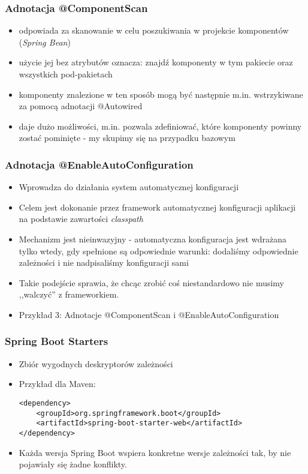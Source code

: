 \documentclass{beamer}
\begin{document}
\begin{frame}
\frametitle{Adnotacja @ComponentScan}
\begin{itemize}
\item odpowiada za skanowanie w celu poszukiwania w projekcie komponentów (\textit{Spring Bean})
\item użycie jej bez atrybutów oznacza: znajdź komponenty w tym pakiecie oraz wszystkich pod-pakietach
\item komponenty znalezione w ten sposób mogą być następnie m.in. wstrzykiwane za pomocą adnotacji @Autowired
\item daje dużo możliwości, m.in. pozwala zdefiniować, które komponenty powinny zostać pominięte - my skupimy się na przypadku bazowym
\end{itemize}
\end{frame}

\begin{frame}
\frametitle{Adnotacja @EnableAutoConfiguration}
\begin{itemize}
\item Wprowadza do działania system automatycznej konfiguracji
\item Celem jest dokonanie przez framework automatycznej konfiguracji aplikacji na podstawie zawartości \textit{classpath}
\item Mechanizm jest nieinwazyjny - automatyczna konfiguracja jest wdrażana tylko wtedy, gdy spełnione są odpowiednie warunki: dodaliśmy odpowiednie zależności i nie nadpisaliśmy konfiguracji sami
\item Takie podejście sprawia, że chcąc zrobić coś niestandardowo nie musimy ,,walczyć'' z frameworkiem.
\item Przykład 3: Adnotacje @ComponentScan i @EnableAutoConfiguration
\end{itemize}
\end{frame}


\begin{frame}[fragile]
\frametitle{Spring Boot Starters}
\begin{itemize}
\item Zbiór wygodnych deskryptorów zależności
\item Przykład dla Maven:
\begin{lstlisting}
<dependency>
    <groupId>org.springframework.boot</groupId>
    <artifactId>spring-boot-starter-web</artifactId>
</dependency>
\end{lstlisting}
\item Każda wersja Spring Boot wspiera konkretne wersje zależności tak, by nie pojawiały się żadne konflikty.
\end{itemize}
\end{frame}
\end{document}
